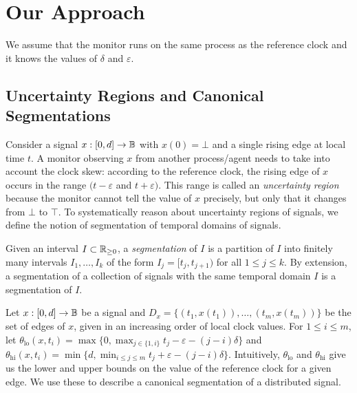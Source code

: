 \section{Our Approach}

We assume that the monitor runs on the same process as the reference clock and it knows the values of $\delta$ and $\varepsilon$.

\subsection{Uncertainty Regions and Canonical Segmentations}

Consider a signal $x : [0,d] \to \mathbb{B}$ with $x(0) = \bot$ and a single rising edge at local time $t$.
A monitor observing $x$ from another process/agent needs to take into account the clock skew: according to the reference clock, the rising edge of $x$ occurs in the range $(t - \varepsilon$ and $t + \varepsilon)$.
This range is called an \emph{uncertainty region} because the monitor cannot tell the value of $x$ precisely, but only that it changes from $\bot$ to $\top$.
To systematically reason about uncertainty regions of signals, we define the notion of segmentation of temporal domains of signals.

\begin{definition}
	Given an interval $I \subset \mathbb{R}_{\geq 0}$, a \emph{segmentation} of $I$ is a partition of $I$ into finitely many intervals $I_1, \ldots, I_k$ of the form \alert{$I_j = [t_j, t_{j+1})$} for all $1 \leq j \leq k$.
	By extension, a segmentation of a collection of signals with the same temporal domain $I$ is a segmentation of $I$.
\end{definition}

Let $x : [0,d] \to \mathbb{B}$ be a signal and $D_x = \{(t_1, x(t_1)), \ldots, (t_m, x(t_m))\}$ be the set of edges of $x$, given in an increasing order of local clock values.
For $1 \leq i \leq m$, let $\theta_{\text{lo}}(x,t_i) = \max\{0, \max_{j \in \{1, i\}} t_j - \varepsilon - (j-i)\delta\}$ and $\theta_{\text{hi}}(x,t_i) = \min\{d, \min_{i \leq j \leq m} t_j + \varepsilon - (j-i)\delta\}$.
Intuitively, $\theta_{\text{lo}}$ and $\theta_{\text{hi}}$ give us the lower and upper bounds on the value of the reference clock for a given edge.
We use these to describe a canonical segmentation of a distributed signal.

